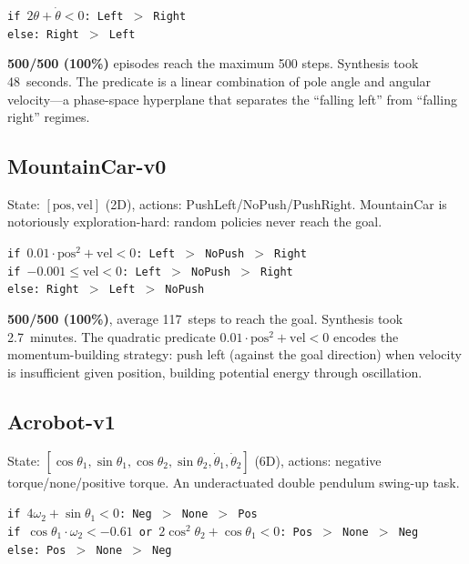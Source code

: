 \documentclass[9pt,a4paper]{article}
\theoremstyle{plain}
\theoremstyle{definition}
\theoremstyle{remark}
\begin{document}
\begin{center}
\texttt{if $2\theta + \dot{\theta} < 0$: Left $>$ Right} \\
\texttt{else: Right $>$ Left}
\end{center}

\textbf{500/500 (100\%)} episodes reach the maximum 500 steps.
Synthesis took 48~seconds. The predicate is a linear combination
of pole angle and angular velocity---a phase-space hyperplane
that separates the ``falling left'' from ``falling right'' regimes.

\subsection{MountainCar-v0}

State: $[\text{pos}, \text{vel}]$ (2D), actions: PushLeft/NoPush/PushRight.
MountainCar is notoriously exploration-hard: random policies
never reach the goal.

\begin{center}
\texttt{if $0.01 \cdot \text{pos}^2 + \text{vel} < 0$: Left $>$ NoPush $>$ Right} \\
\texttt{if $-0.001 \le \text{vel} < 0$: Left $>$ NoPush $>$ Right} \\
\texttt{else: Right $>$ Left $>$ NoPush}
\end{center}

\textbf{500/500 (100\%)}, average 117~steps to reach the goal.
Synthesis took 2.7~minutes. The quadratic predicate
$0.01 \cdot \text{pos}^2 + \text{vel} < 0$ encodes the
momentum-building strategy: push left (against the goal direction)
when velocity is insufficient given position, building potential
energy through oscillation.

\subsection{Acrobot-v1}

State: $[\cos\theta_1, \sin\theta_1, \cos\theta_2, \sin\theta_2,
\dot{\theta}_1, \dot{\theta}_2]$ (6D), actions: negative
torque/none/positive torque. An underactuated double pendulum
swing-up task.

\begin{center}
\texttt{if $4\omega_2 + \sin\theta_1 < 0$: Neg $>$ None $>$ Pos} \\
\texttt{if $\cos\theta_1 \cdot \omega_2 < -0.61$ or $2\cos^2\!\theta_2 + \cos\theta_1 < 0$: Pos $>$ None $>$ Neg} \\
\texttt{else: Pos $>$ None $>$ Neg}
\end{center}
\end{document}
